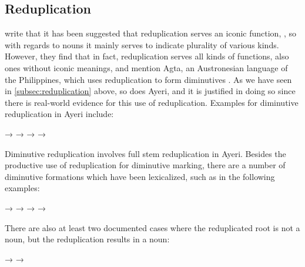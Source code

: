 
\subsection{Reduplication}

\citet{wiltshiremarantz2000} write that it has been suggested that 
reduplication serves an iconic function, 
, so with 
regards to nouns it mainly serves to indicate plurality of various kinds. 
However, they find that in fact, reduplication serves all kinds of functions, 
also ones without iconic meanings, and mention Agta, an Austronesian language of 
the Philippines, which uses reduplication to form diminutives 
\citep[6--9]{healey1960}. As we have seen in \autoref{subsec:reduplication} 
above, so does Ayeri, and it is justified in doing so since there is 
real-world evidence for this use of reduplication. Examples for diminutive 
reduplication in Ayeri include:

\pex
	\a {}
		→ 
	\a {}
		→ 
	\a {}
		→ 
	\a {}
		→ 
\xe

Diminutive reduplication involves full stem reduplication in Ayeri. 
Besides the productive use of reduplication for diminutive marking, there are 
a number of diminutive formations which have been lexicalized, such as in the 
following examples:

\pex
	\a {}
		→ 
	\a {}
		→ 
	\a {}
		→ 
	\a {}
		→ 
\xe

There are also at least two documented cases where the reduplicated root is not 
a noun, but the reduplication results in a noun:

\pex
	\a {}
		→ 
	\a {}
		→ 
\xe

